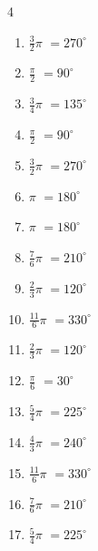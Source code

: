 \begin{multicols}{4}
\begin{enumerate}
  \item $\displaystyle \frac{3}{2}\pi$
        $\displaystyle =270^{\circ}$

  \item $\displaystyle \frac{\pi}{2}$
        $\displaystyle =90^{\circ}$

  \item $\displaystyle \frac{3}{4}\pi$
        $\displaystyle =135^{\circ}$

  \item $\displaystyle \frac{\pi}{2}$
        $\displaystyle =90^{\circ}$

  \item $\displaystyle \frac{3}{2}\pi$
        $\displaystyle =270^{\circ}$

  \item $\displaystyle \pi$
        $\displaystyle =180^{\circ}$

  \item $\displaystyle \pi$
        $\displaystyle =180^{\circ}$

  \item $\displaystyle \frac{7}{6}\pi$
        $\displaystyle =210^{\circ}$

  \item $\displaystyle \frac{2}{3}\pi$
        $\displaystyle =120^{\circ}$

  \item $\displaystyle \frac{11}{6}\pi$
        $\displaystyle =330^{\circ}$

  \item $\displaystyle \frac{2}{3}\pi$
        $\displaystyle =120^{\circ}$

  \item $\displaystyle \frac{\pi}{6}$
        $\displaystyle =30^{\circ}$

  \item $\displaystyle \frac{5}{4}\pi$
        $\displaystyle =225^{\circ}$

  \item $\displaystyle \frac{4}{3}\pi$
        $\displaystyle =240^{\circ}$

  \item $\displaystyle \frac{11}{6}\pi$
        $\displaystyle =330^{\circ}$

  \item $\displaystyle \frac{7}{6}\pi$
        $\displaystyle =210^{\circ}$

  \item $\displaystyle \frac{5}{4}\pi$
        $\displaystyle =225^{\circ}$


\end{enumerate}
\end{multicols}
